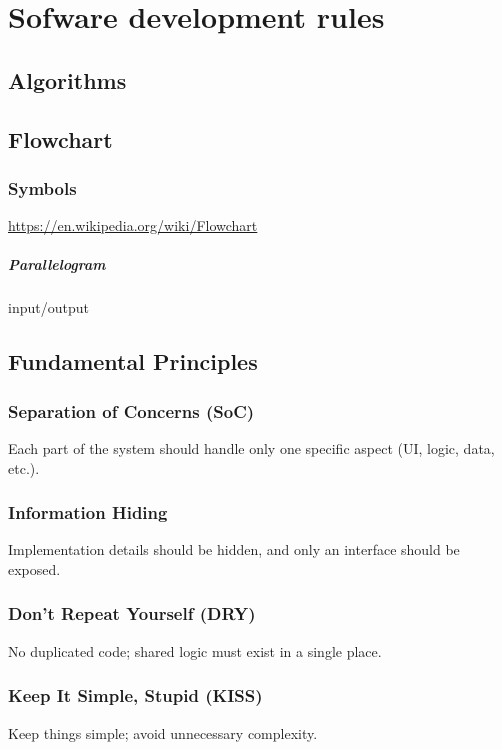 \chapter{Sofware development rules}

\section{Algorithms}

\section{Flowchart}
    \subsection{Symbols}
        \url{https://en.wikipedia.org/wiki/Flowchart}
        \paragraph{Parallelogram}
            input/output

\section{Fundamental Principles}
    
    \subsection{Separation of Concerns (SoC)}
        Each part of the system should handle only one specific aspect (UI, logic, data, etc.).
    
    \subsection{Information Hiding}
        Implementation details should be hidden, and only an interface should be exposed.
    
    \subsection{Don’t Repeat Yourself (DRY)}
        No duplicated code; shared logic must exist in a single place.
    
    \subsection{Keep It Simple, Stupid (KISS)}
        Keep things simple; avoid unnecessary complexity.
    
